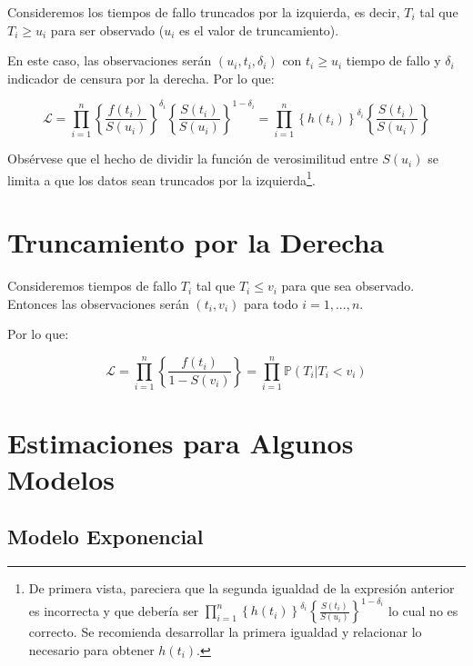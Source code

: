 \documentclass[
  a4paper,
  oneside,
  openany]{book}
\begin{document}
Consideremos los tiempos de fallo truncados por la izquierda, es decir, \(T_{i}\) tal que \(T_{i}\geq u_{i}\) para ser observado (\(u_{i}\) es el valor de truncamiento).

En este caso, las observaciones serán \((u_{i}, t_{i},\delta_{i})\) con \(t_{i}\geq u_{i}\) tiempo de fallo y \(\delta_{i}\) indicador de censura por la derecha. Por lo que:

\[
\mathbf{\mathscr{L}} = \prod_{i=1}^{n}\left\{\frac{f(t_{i})}{S(u_{i})}\right\}^{\delta_{i}}\left\{\frac{S(t_{i})}{S(u_{i})}\right\}^{1-\delta_{i}}=\prod_{i=1}^{n}\left\{h(t_{i})\right\}^{\delta_{i}}\left\{\frac{S(t_{i})}{S(u_{i})}\right\}
\]

Obsérvese que el hecho de dividir la función de verosimilitud entre \(S(u_{i})\) se limita a que los datos sean truncados por la izquierda\footnote{De primera vista, pareciera que la segunda igualdad de la expresión anterior es incorrecta y que debería ser \(\prod_{i=1}^{n}\left\{h(t_{i})\right\}^{\delta_{i}}\left\{\frac{S(t_{i})}{S(u_{i})}\right\}^{1-\delta_i}\) lo cual no es correcto. Se recomienda desarrollar la primera igualdad y relacionar lo necesario para obtener \(h(t_i)\).}.

\hypertarget{truncamiento-por-la-derecha}{%
\section{Truncamiento por la Derecha}\label{truncamiento-por-la-derecha}}

Consideremos tiempos de fallo \(T_{i}\) tal que \(T_{i} \leq v_{i}\) para que sea observado. Entonces las observaciones serán \((t_{i}, v_{i})\) para todo \(i = 1,...,n\).

Por lo que:

\[
\mathbf{\mathscr{L}} = \prod_{i=1}^{n}\left\{\frac{f(t_{i})}{1-S(v_{i})}\right\} =\prod_{i=1}^{n} \mathbb{P}(T_{i}|T_{i}<v_{i})
\]

\hypertarget{estimaciones-para-algunos-modelos}{%
\section{Estimaciones para Algunos Modelos}\label{estimaciones-para-algunos-modelos}}

\hypertarget{modelo-exponencial-1}{%
\subsection*{Modelo Exponencial}\label{modelo-exponencial-1}}
\end{document}
